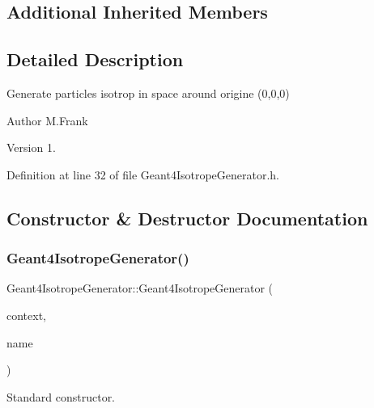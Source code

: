\subsection*{Additional Inherited Members}


\subsection{Detailed Description}
Generate particles isotrop in space around origine (0,0,0) 

\begin{DoxyAuthor}{Author}
M.\+Frank 
\end{DoxyAuthor}
\begin{DoxyVersion}{Version}
1. 
\end{DoxyVersion}


Definition at line 32 of file Geant4\+Isotrope\+Generator.\+h.



\subsection{Constructor \& Destructor Documentation}
\hypertarget{class_d_d4hep_1_1_simulation_1_1_geant4_isotrope_generator_ac90529dd8592e8377045d50037483a6e}{}\label{class_d_d4hep_1_1_simulation_1_1_geant4_isotrope_generator_ac90529dd8592e8377045d50037483a6e} 
\subsubsection{\texorpdfstring{Geant4\+Isotrope\+Generator()}{Geant4IsotropeGenerator()}}
{\footnotesize\ttfamily Geant4\+Isotrope\+Generator\+::\+Geant4\+Isotrope\+Generator (\begin{DoxyParamCaption}\item[{\hyperlink{class_d_d4hep_1_1_simulation_1_1_geant4_context}{Geant4\+Context} $\ast$}]{context,  }\item[{const std\+::string \&}]{name }\end{DoxyParamCaption})}



Standard constructor. 



